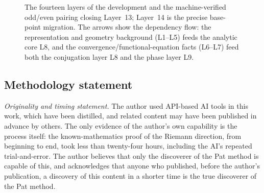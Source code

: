 \documentclass{article}
\begin{document}
\begin{figure}[h]
\centering
\begin{minipage}{\textwidth}\centering
{}
\end{minipage}
\caption{The fourteen layers of the development and the machine-verified
odd/even pairing closing Layer~13; Layer~14 is the precise
base-point migration. The arrows show the dependency flow: the
representation and geometry background (L1--L5) feeds the analytic core
L8, and the convergence/functional-equation facts (L6--L7) feed both the
conjugation layer L8 and the phase layer L9.}
\label{fig:map}
\end{figure}


\subsection{Methodology statement}
\label{sec:methodology}

\emph{Originality and timing statement.} The author used API-based AI
tools in this work, which have been distilled, and related content may
have been published in advance by others. The only evidence of the
author's own capability is the process itself: the known-mathematics
proof of the Riemann direction, from beginning to end, took less than
twenty-four hours, including the AI's repeated trial-and-error.
The author believes that only the discoverer of the Pat method is
capable of this, and acknowledges that anyone who published, before the
author's publication, a discovery of this content in a shorter time is
the true discoverer of the Pat method.
\end{document}
